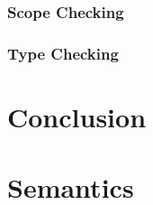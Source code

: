 \subsection{Scope Checking}
\subsection{Type Checking}

\renewcommand{\ind}[1]{}
\chapter{Conclusion}



\begingroup
	\raggedright
	{}	%
\endgroup


\newpage
\listoffixmes	%

\clearforchapter
\appendix	%


\renewcommand{\ind}[1]{}
\chapter{Semantics}
\ind{TransitionRules}
